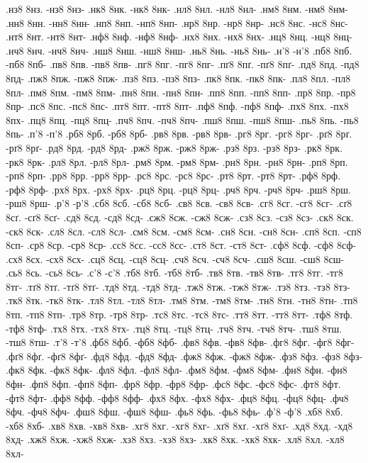 {.нз8 8нз. -нз8 8нз-
.нк8 8нк. -нк8 8нк-
.нл8 8нл. -нл8 8нл-
.нм8 8нм. -нм8 8нм-
.нн8 8нн. -нн8 8нн-
.нп8 8нп. -нп8 8нп-
.нр8 8нр. -нр8 8нр-
.нс8 8нс. -нс8 8нс-
.нт8 8нт. -нт8 8нт-
.нф8 8нф. -нф8 8нф-
.нх8 8нх. -нх8 8нх-
.нц8 8нц. -нц8 8нц-
.нч8 8нч. -нч8 8нч-
.нш8 8нш. -нш8 8нш-
.нь8 8нь. -нь8 8нь-
.н'8 -н'8
.пб8 8пб. -пб8 8пб-
.пв8 8пв. -пв8 8пв-
.пг8 8пг. -пг8 8пг-
.пґ8 8пґ. -пґ8 8пґ-
.пд8 8пд. -пд8 8пд-
.пж8 8пж. -пж8 8пж-
.пз8 8пз. -пз8 8пз-
.пк8 8пк. -пк8 8пк-
.пл8 8пл. -пл8 8пл-
.пм8 8пм. -пм8 8пм-
.пн8 8пн. -пн8 8пн-
.пп8 8пп. -пп8 8пп-
.пр8 8пр. -пр8 8пр-
.пс8 8пс. -пс8 8пс-
.пт8 8пт. -пт8 8пт-
.пф8 8пф. -пф8 8пф-
.пх8 8пх. -пх8 8пх-
.пц8 8пц. -пц8 8пц-
.пч8 8пч. -пч8 8пч-
.пш8 8пш. -пш8 8пш-
.пь8 8пь. -пь8 8пь-
.п'8 -п'8
.рб8 8рб. -рб8 8рб-
.рв8 8рв. -рв8 8рв-
.рг8 8рг. -рг8 8рг-
.рґ8 8рґ. -рґ8 8рґ-
.рд8 8рд. -рд8 8рд-
.рж8 8рж. -рж8 8рж-
.рз8 8рз. -рз8 8рз-
.рк8 8рк. -рк8 8рк-
.рл8 8рл. -рл8 8рл-
.рм8 8рм. -рм8 8рм-
.рн8 8рн. -рн8 8рн-
.рп8 8рп. -рп8 8рп-
.рр8 8рр. -рр8 8рр-
.рс8 8рс. -рс8 8рс-
.рт8 8рт. -рт8 8рт-
.рф8 8рф. -рф8 8рф-
.рх8 8рх. -рх8 8рх-
.рц8 8рц. -рц8 8рц-
.рч8 8рч. -рч8 8рч-
.рш8 8рш. -рш8 8рш-
.р'8 -р'8
.сб8 8сб. -сб8 8сб-
.св8 8св. -св8 8св-
.сг8 8сг. -сг8 8сг-
.сґ8 8сґ. -сґ8 8сґ-
.сд8 8сд. -сд8 8сд-
.сж8 8сж. -сж8 8сж-
.сз8 8сз. -сз8 8сз-
.ск8 8ск. -ск8 8ск-
.сл8 8сл. -сл8 8сл-
.см8 8см. -см8 8см-
.сн8 8сн. -сн8 8сн-
.сп8 8сп. -сп8 8сп-
.ср8 8ср. -ср8 8ср-
.сс8 8сс. -сс8 8сс-
.ст8 8ст. -ст8 8ст-
.сф8 8сф. -сф8 8сф-
.сх8 8сх. -сх8 8сх-
.сц8 8сц. -сц8 8сц-
.сч8 8сч. -сч8 8сч-
.сш8 8сш. -сш8 8сш-
.сь8 8сь. -сь8 8сь-
.с'8 -с'8
.тб8 8тб. -тб8 8тб-
.тв8 8тв. -тв8 8тв-
.тг8 8тг. -тг8 8тг-
.тґ8 8тґ. -тґ8 8тґ-
.тд8 8тд. -тд8 8тд-
.тж8 8тж. -тж8 8тж-
.тз8 8тз. -тз8 8тз-
.тк8 8тк. -тк8 8тк-
.тл8 8тл. -тл8 8тл-
.тм8 8тм. -тм8 8тм-
.тн8 8тн. -тн8 8тн-
.тп8 8тп. -тп8 8тп-
.тр8 8тр. -тр8 8тр-
.тс8 8тс. -тс8 8тс-
.тт8 8тт. -тт8 8тт-
.тф8 8тф. -тф8 8тф-
.тх8 8тх. -тх8 8тх-
.тц8 8тц. -тц8 8тц-
.тч8 8тч. -тч8 8тч-
.тш8 8тш. -тш8 8тш-
.т'8 -т'8
.фб8 8фб. -фб8 8фб-
.фв8 8фв. -фв8 8фв-
.фг8 8фг. -фг8 8фг-
.фґ8 8фґ. -фґ8 8фґ-
.фд8 8фд. -фд8 8фд-
.фж8 8фж. -фж8 8фж-
.фз8 8фз. -фз8 8фз-
.фк8 8фк. -фк8 8фк-
.фл8 8фл. -фл8 8фл-
.фм8 8фм. -фм8 8фм-
.фн8 8фн. -фн8 8фн-
.фп8 8фп. -фп8 8фп-
.фр8 8фр. -фр8 8фр-
.фс8 8фс. -фс8 8фс-
.фт8 8фт. -фт8 8фт-
.фф8 8фф. -фф8 8фф-
.фх8 8фх. -фх8 8фх-
.фц8 8фц. -фц8 8фц-
.фч8 8фч. -фч8 8фч-
.фш8 8фш. -фш8 8фш-
.фь8 8фь. -фь8 8фь-
.ф'8 -ф'8
.хб8 8хб. -хб8 8хб-
.хв8 8хв. -хв8 8хв-
.хг8 8хг. -хг8 8хг-
.хґ8 8хґ. -хґ8 8хґ-
.хд8 8хд. -хд8 8хд-
.хж8 8хж. -хж8 8хж-
.хз8 8хз. -хз8 8хз-
.хк8 8хк. -хк8 8хк-
.хл8 8хл. -хл8 8хл-
}
